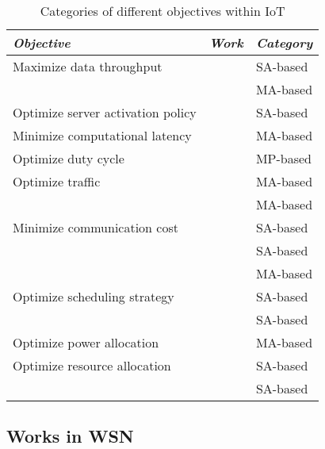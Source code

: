 \documentclass[journal]{IEEEtran}
\begin{document}
\begin{table}
\small
\centering
\caption{Categories of different objectives within IoT}
\label{table:objectives}
\begin{tabular}{lll}
  \hline
 \textit{Objective} & \textit{Work} & \textit{Category} \\
  \hline \hline
   Maximize data throughput &~\cite{Zhong2018} & SA-based\\
                            &~\cite{Jadoon2017} & MA-based\\ \hline
   Optimize server activation policy &~\cite{Conti2017} &  SA-based\\ \hline
   Minimize computational latency&~\cite{Mai2018} & MA-based\\ \hline
   Optimize duty cycle&~\cite{Li2014} & MP-based\\ \hline
   Optimize traffic  &~\cite{routray2017} & MA-based \\
                     &~\cite{Liu2017} & MA-based \\ \hline
   Minimize communication cost &~\cite{OmoniwaRelay2018}  & SA-based\\
                                &~\cite{Li2015}  & SA-based\\
                                &~\cite{Camelo2016} & MA-based\\\hline
   Optimize scheduling strategy &~\cite{Wen15} & SA-based\\
                                &~\cite{Zhu2013} & SA-based\\ \hline
   Optimize power allocation &~\cite{Khan2018} & MA-based\\ \hline
   Optimize resource allocation &~\cite{Gai2018} & SA-based\\
                                &~\cite{Mohammadi2018} & SA-based\\



      \hline \hline
 \end{tabular}
 \end{table}


\subsection{Works in WSN}
\end{document}
